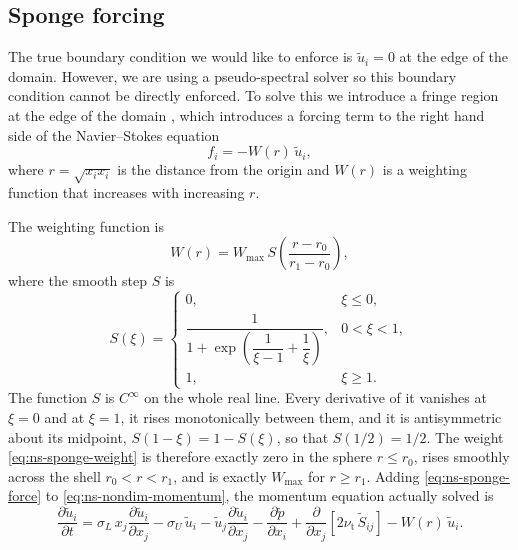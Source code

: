 \documentclass{article}
\begin{document}
\subsection{Sponge forcing}\label{ssec:ns-sponge}
The true boundary condition we would like to enforce is $\tilde u_i = 0$ at the edge of the domain. However, we are using a pseudo-spectral solver so
this boundary condition cannot be directly enforced. To solve this we introduce a fringe region at the edge of the domain \cite{nordstrom1999fringe},
which introduces a forcing term to the right hand side of the Navier--Stokes equation
\begin{equation}\label{eq:ns-sponge-force}
  f_i = -W(r)\, \tilde u_i,
\end{equation}
where $r = \sqrt{x_ix_i}$ is the distance from the origin and $W(r)$ is a weighting function that increases with increasing $r$.

The weighting function is
\begin{equation}\label{eq:ns-sponge-weight}
  W(r) = W_{\max}\, S\!\left( \frac{r - r_0}{r_1 - r_0} \right),
\end{equation}
where the smooth step $S$ is
\begin{equation}\label{eq:ns-sponge-step}
  S(\xi) =
  \begin{cases}
    0, & \xi \le 0, \\[4pt]
    \dfrac{1}{1 + \exp\!\left( \dfrac{1}{\xi - 1} + \dfrac{1}{\xi} \right)}, & 0 < \xi < 1, \\[10pt]
    1, & \xi \ge 1 .
  \end{cases}
\end{equation}
The function $S$ is $C^\infty$ on the whole real line. Every derivative of it
vanishes at $\xi = 0$ and at $\xi = 1$, it rises monotonically between them,
and it is antisymmetric about its midpoint, $S(1 - \xi) = 1 - S(\xi)$, so that
$S(1/2) = 1/2$. The weight \eqref{eq:ns-sponge-weight} is therefore exactly zero in
the sphere $r \le r_0$, rises smoothly across the shell $r_0 < r < r_1$, and
is exactly $W_{\max}$ for $r \ge r_1$. Adding \eqref{eq:ns-sponge-force} to
\eqref{eq:ns-nondim-momentum}, the momentum equation actually solved is
\begin{equation}\label{eq:ns-nondim-momentum-sponge}
  \frac{\partial \tilde u_i}{\partial t}
  = \sigma_L\, x_j \frac{\partial \tilde u_i}{\partial x_j}
  - \sigma_U\, \tilde u_i
  - \tilde u_j \frac{\partial \tilde u_i}{\partial x_j}
  - \frac{\partial \tilde p}{\partial x_i}
  + \frac{\partial}{\partial x_j}\left[ 2 \nu_{\mathrm{t}}\, \tilde S_{ij} \right]
  - W(r)\, \tilde u_i .
\end{equation}
\end{document}
